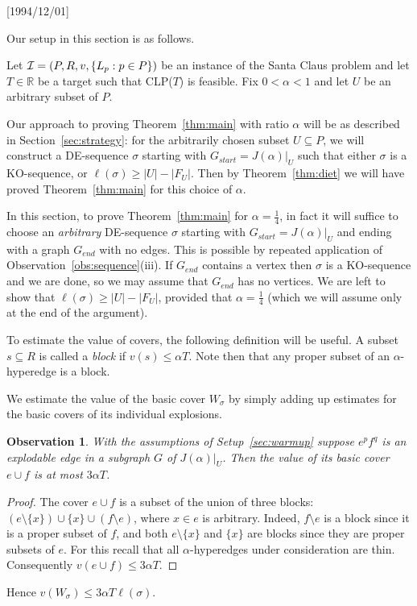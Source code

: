 \NeedsTeXFormat{LaTeX2e}[1994/12/01]\documentclass[letterpaper, 11pt]{article}
\newtheorem{obs}[thm]{Observation}
\theoremstyle{definition}
\theoremstyle{remark}
\numberwithin{equation}{section}
\begin{document}
Our setup in this section is as follows.

\bigskip
{}
Let ${\cal I} = (P, R , v, \{L_p : p\in P\})$ be an instance of the
Santa Claus problem and let $T\in \mathbb{R}$ be a target such that
CLP($T$) is feasible. Fix $0 < \alpha < 1$ and let $U$ be
an arbitrary subset of $P$. 
\bigskip

Our approach to proving  Theorem~\ref{thm:main} with ratio $\alpha$
will be as described in Section~\ref{sec:strategy}: for the
arbitrarily chosen subset $U\subseteq P$, we will construct a
DE-sequence $\sigma$ starting with 
  $G_{start}=J(\alpha)|_U$ such that either $\sigma$ is a KO-sequence, or
  $\ell(\sigma)\geq |U|-|F_U|$.  Then by Theorem~\ref{thm:diet} we
  will have proved Theorem~\ref{thm:main} for this choice of
  $\alpha$. 

In this section, to prove  Theorem~\ref{thm:main}
for $\alpha=\frac14$, in fact it will suffice to choose an {\em
  arbitrary} DE-sequence $\sigma$ starting 
with $G_{start}=J(\alpha)|_U$ and ending with a graph $G_{end}$ with
no edges. This is possible by repeated application of
Observation~\ref{obs:sequence}(iii). 
If $G_{end}$ contains a vertex then $\sigma$ is a KO-sequence and we
are done, so we may assume that $G_{end}$ has no vertices.
We are left to show that $\ell (\sigma) \geq |U|-|F_U|$, provided that
$\alpha=\frac14$ (which we will assume only at the end of the argument).

To estimate the value of covers,  the following definition will be useful.
A subset $s\subseteq R$ is called a {\em block} if $v(s) \leq \alpha T$. Note then that any proper subset of an $\alpha$-hyperedge is 
a block. 

We estimate the value of the basic cover $W_{\sigma}$ by simply adding
up estimates for the basic covers of its individual explosions. 
\begin{obs} \label{obs:basic} With the assumptions of
  Setup~\ref{sec:warmup} suppose $e^pf^q$ is an explodable edge in a subgraph $G$ of $J(\alpha)|_U$.
Then the value of its basic cover $e\cup f$ is at most $3\alpha T$. \end{obs}
\begin{proof}
The cover $e\cup f$ is a subset of the union of three blocks:
$(e\setminus \{ x \}) \cup \{ x \} \cup (f\setminus e)$, where $x\in e$
is arbitrary. Indeed, $f\setminus e$ is a block since it is a proper
subset of $f$, and both $e\setminus\{x\}$ and $\{ x\}$ are blocks since they are
proper subsets of 
$e$. For this recall that all $\alpha$-hyperedges under consideration are
thin. Consequently  $v(e\cup f) \leq 3\alpha T$. \end{proof}
Hence $v(W_{\sigma}) \leq 3\alpha T\ell (\sigma)$. 
\end{document}
